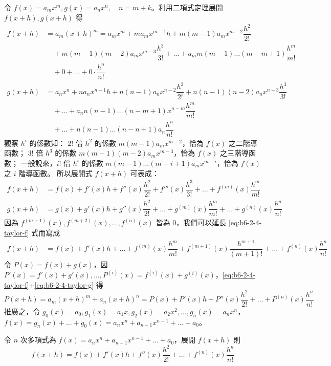 令 $f(x)=a_m x^m, g(x)=a_n x^n, \quad n=m+k$。利用二項式定理展開 $f(x+h), g(x+h)$ 得
\begin{align*}
f(x+h) &= a_m(x+h)^m = a_m x^m + m a_m x^{m-1}h + m(m-1)a_m x^{m-2}\dfrac{h^2}{2!} \\
&\quad + m(m-1)(m-2)a_m x^{m-3}\dfrac{h^3}{3!} + \dots + a_m m(m-1)\dots(m-m+1)\dfrac{h^m}{m!} \\
&\quad + 0 + \dots + 0 \cdot \dfrac{h^n}{n!} \\
g(x+h) &= a_n x^n + n a_n x^{n-1}h + n(n-1)a_n x^{n-2}\dfrac{h^2}{2!} + n(n-1)(n-2)a_n x^{n-3}\dfrac{h^3}{3!} \\
&\quad + \dots + a_n n(n-1)\dots(n-m+1)x^{n-m}\dfrac{h^m}{m!} \\
&\quad + \dots + n(n-1)\dots(n-n+1)a_n \dfrac{h^n}{n!}
\end{align*}
觀察 $h^i$ 的係數知：
$2!$ 倍 $h^2$ 的係數 $m(m-1)a_m x^{m-2}$，恰為 $f(x)$ 之二階導函數；
$3!$ 倍 $h^3$ 的係數 $m(m-1)(m-2)a_m x^{m-3}$，恰為 $f(x)$ 之三階導函數；
一般說來，$i!$ 倍 $h^i$ 的係數 $m(m-1)\dots(m-i+1)a_m x^{m-i}$，恰為 $f(x)$ 之 $i$ 階導函數。
所以展開式 $f(x+h)$ 可表成：
\begin{align}
f(x+h) &= f(x) + f'(x)h + f''(x)\dfrac{h^2}{2!} + f'''(x)\dfrac{h^3}{3!} + \dots + f^{(m)}(x)\dfrac{h^m}{m!} \label{eq:b6-2-4-taylor-f} \\
g(x+h) &= g(x) + g'(x)h + g''(x)\dfrac{h^2}{2!} + \dots + g^{(m)}(x)\dfrac{h^m}{m!} + \dots + g^{(n)}(x)\dfrac{h^n}{n!} \label{eq:b6-2-4-taylor-g}
\end{align}
因為 $f^{(m+1)}(x), f^{(m+2)}(x), \dots, f^{(n)}(x)$ 皆為 0，我們可以延長 \eqref{eq:b6-2-4-taylor-f} 式而寫成
\begin{align}
f(x+h) &= f(x) + f'(x)h + \dots + f^{(m)}(x)\dfrac{h^m}{m!} + f^{(m+1)}(x)\dfrac{h^{m+1}}{(m+1)!} + \dots + f^{(n)}(x)\dfrac{h^n}{n!} \label{eq:b6-2-4-taylor-fp}
\end{align}
令 $P(x)=f(x)+g(x)$，因 $P'(x)=f'(x)+g'(x), \dots, P^{(i)}(x)=f^{(i)}(x)+g^{(i)}(x)$，\eqref{eq:b6-2-4-taylor-f}+\eqref{eq:b6-2-4-taylor-g} 得
\[ P(x+h) = a_m(x+h)^m + a_n(x+h)^n = P(x) + P'(x)h + P''(x)\dfrac{h^2}{2!} + \dots + P^{(n)}(x)\dfrac{h^n}{n!} \]
推廣之，令 $g_0(x)=a_0, g_1(x)=a_1 x, g_2(x)=a_2 x^2, \dots, g_n(x)=a_n x^n$，
$f(x) = g_n(x) + \dots + g_0(x) = a_n x^n + a_{n-1} x^{n-1} + \dots + a_0$。

\begin{theorem}\label{thm:b6-2-taylor}
令 $n$ 次多項式為 $f(x)=a_n x^n + a_{n-1} x^{n-1} + \dots + a_0$，展開 $f(x+h)$ 則
\begin{equation}
f(x+h) = f(x) + f'(x)h + f''(x)\dfrac{h^2}{2!} + \dots + f^{(n)}(x)\dfrac{h^n}{n!} \tag{I} \label{eq:b6-2-4-taylor-I}
\end{equation}
\end{theorem}


